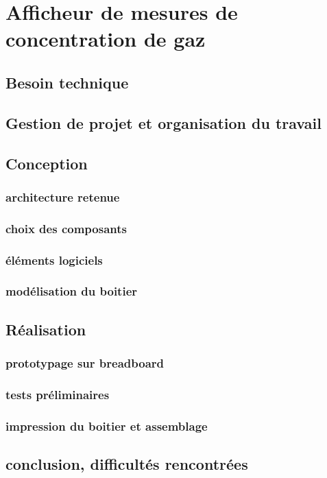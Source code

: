 \documentclass[a4paper]{report}
\begin{document}
	\chapter{Afficheur de mesures de concentration de gaz}
	
	
	\section{Besoin technique}
	
	\section{Gestion de projet et organisation du travail}
	
	\section{Conception}
	\subsection{architecture retenue}
	\subsection{choix des composants}
	\subsection{éléments logiciels}
	\subsection{modélisation du boitier}
	
	\section{Réalisation}
	\subsection{prototypage sur breadboard}
	\subsection{tests préliminaires}
	\subsection{impression du boitier et assemblage}
	
	\section{conclusion, difficultés rencontrées}
\end{document}
